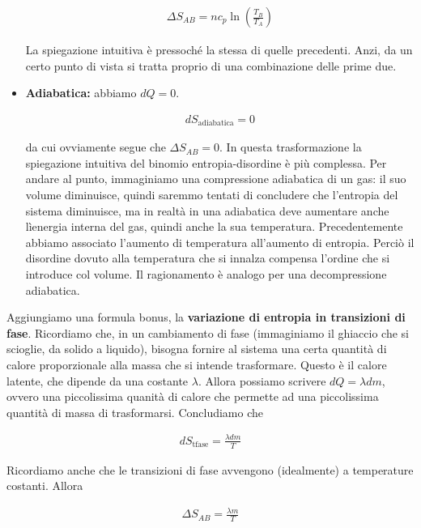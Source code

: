 \begin{itemize}
    \begin{align}
        \Delta S_{AB} = nc_p\ln\left(\frac{T_B}{T_A}\right)
    \end{align}

    \noindent La spiegazione intuitiva è pressoché la stessa di
    quelle precedenti. Anzi, da un certo punto di vista si tratta
    proprio di una combinazione delle prime due.

    \item \textbf{Adiabatica:} abbiamo $dQ = 0$.
    
    \begin{align}
        dS_\text{adiabatica} = 0
    \end{align}

    \noindent da cui ovviamente segue che $\Delta S_{AB} = 0$.
    In questa trasformazione la spiegazione intuitiva del
    binomio entropia-disordine è più complessa. Per andare al punto,
    immaginiamo una compressione adiabatica di un gas: il suo
    volume diminuisce, quindi saremmo tentati di concludere che
    l'entropia del sistema diminuisce, ma in realtà in una adiabatica
    deve aumentare anche lìenergia interna del gas, quindi anche la
    sua temperatura. Precedentemente abbiamo associato l'aumento di
    temperatura all'aumento di entropia. Perciò il disordine dovuto
    alla temperatura che si innalza compensa l'ordine che si introduce
    col volume. Il ragionamento è analogo per una decompressione
    adiabatica.
\end{itemize}

\noindent Aggiungiamo una formula bonus, la \textbf{variazione di
entropia in transizioni di fase}. Ricordiamo che, in un cambiamento
di fase (immaginiamo il ghiaccio che si scioglie, da solido a liquido),
bisogna fornire al sistema una certa quantità di calore proporzionale
alla massa che si intende trasformare. Questo è il calore latente,
che dipende da una costante $\lambda$. Allora possiamo scrivere
$dQ = \lambda dm$, ovvero una piccolissima quanità di calore che
permette ad una piccolissima quantità di massa di trasformarsi.
Concludiamo che

\begin{align}
    dS_\text{tfase} = \frac{\lambda dm}{T}
\end{align}

\noindent Ricordiamo anche che le transizioni di fase avvengono
(idealmente) a temperature costanti. Allora

\begin{align}
    \Delta S_{AB} = \frac{\lambda m}{T}
\end{align}

